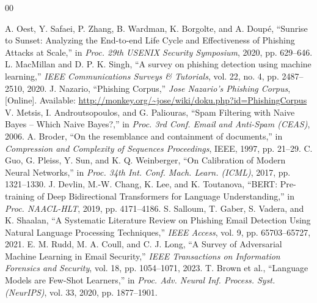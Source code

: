 \documentclass{ieeeaccess}
\begin{document}
\begin{thebibliography}{00}

 A. Oest, Y. Safaei, P. Zhang, B. Wardman, K. Borgolte, and A. Doup{\'e}, ``Sunrise to Sunset: Analyzing the End-to-end Life Cycle and Effectiveness of Phishing Attacks at Scale,'' in \emph{Proc. 29th USENIX Security Symposium}, 2020, pp. 629--646.
 L. MacMillan and D. P. K. Singh, ``A survey on phishing detection using machine learning,'' \emph{IEEE Communications Surveys \& Tutorials}, vol. 22, no. 4, pp. 2487--2510, 2020.
 J. Nazario, ``Phishing Corpus,'' \emph{Jose Nazario's Phishing Corpus}, [Online]. Available: \url{http://monkey.org/~jose/wiki/doku.php?id=PhishingCorpus}
 V. Metsis, I. Androutsopoulos, and G. Paliouras, ``Spam Filtering with Naive Bayes -- Which Naive Bayes?,'' in \emph{Proc. 3rd Conf. Email and Anti-Spam (CEAS)}, 2006.
 A. Broder, ``On the resemblance and containment of documents,'' in \emph{Compression and Complexity of Sequences Proceedings}, IEEE, 1997, pp. 21--29.
 C. Guo, G. Pleiss, Y. Sun, and K. Q. Weinberger, ``On Calibration of Modern Neural Networks,'' in \emph{Proc. 34th Int. Conf. Mach. Learn. (ICML)}, 2017, pp. 1321--1330.
 J. Devlin, M.-W. Chang, K. Lee, and K. Toutanova, ``BERT: Pre-training of Deep Bidirectional Transformers for Language Understanding,'' in \emph{Proc. NAACL-HLT}, 2019, pp. 4171--4186.
 S. Salloum, T. Gaber, S. Vadera, and K. Shaalan, ``A Systematic Literature Review on Phishing Email Detection Using Natural Language Processing Techniques,'' \emph{IEEE Access}, vol. 9, pp. 65703--65727, 2021.
 E. M. Rudd, M. A. Coull, and C. J. Long, ``A Survey of Adversarial Machine Learning in Email Security,'' \emph{IEEE Transactions on Information Forensics and Security}, vol. 18, pp. 1054--1071, 2023.
 T. Brown et al., ``Language Models are Few-Shot Learners,'' in \emph{Proc. Adv. Neural Inf. Process. Syst. (NeurIPS)}, vol. 33, 2020, pp. 1877--1901.

\end{thebibliography}

\EOD
\end{document}
